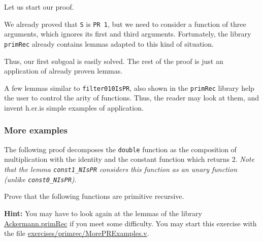 \vspace{4pt}

Let us start our proof.



We already proved that \texttt{S} is \texttt{PR 1}, but we need to consider a function of three arguments, which ignores its first and third arguments.
Fortunately, the library \texttt{primRec} already contains lemmas adapted to this kind of situation.

\vspace{4pt}

\vspace{4pt}


Thus, our first subgoal is easily solved. The rest of the proof 
is just an application of already proven lemmas.

\vspace{4pt}






\begin{exercise}
A few lemmas similar to \texttt{filter010IsPR}, also shown  in the \texttt{primRec} library help the user to control the arity of functions.
Thus, the reader may look at them, and invent h.er.is simple examples of application.
\end{exercise}



\subsubsection{More examples}

The following proof decomposes the \texttt{double} function as the composition of 
multiplication with the identity and the constant function which returns $2$.
\emph{Note that the lemma \texttt{const1\_NIsPR} considers this function as an unary function (unlike \texttt{const0\_NIsPR})}. 




\begin{exercise}
Prove that the following functions are primitive recursive. 






\textbf{Hint:} You may have to look again at the lemmas of the library
\href{../theories/html/hydras.Ackermann.primRec.html}{Ackermann.primRec} if you meet some difficulty.
You may start this exercise with the file
    \href{https://github.com/coq-community/hydra-battles/blob/master/exercises/primrec/MorePRExamples.v}{exercises/primrec/MorePRExamples.v}.
\end{exercise}

